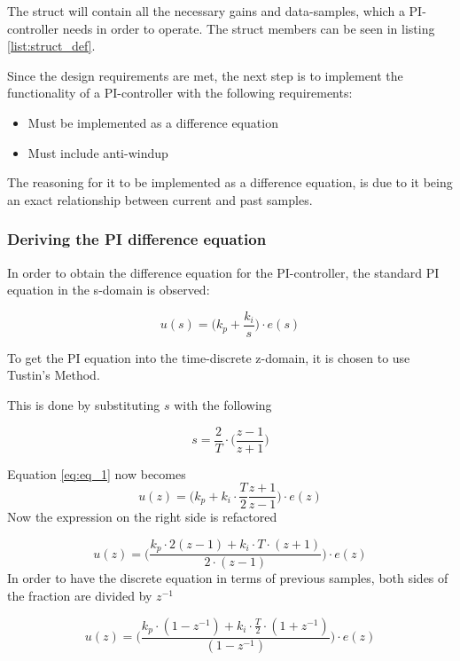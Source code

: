 \documentclass[../../../main]{subfiles}
\begin{document}
The struct will contain all the necessary gains and data-samples, which a PI-controller needs in order to operate.
The struct members can be seen in listing \ref{list:struct_def}.


Since the design requirements are met, the next step is to implement the functionality of a PI-controller with the following requirements:
\begin{itemize}
    \item Must be implemented as a difference equation
    \item Must include anti-windup
\end{itemize}
The reasoning for it to be implemented as a difference equation, is due to it being an exact relationship between current and past samples.

\subsubsection{Deriving the PI difference equation}

In order to obtain the difference equation for the PI-controller, the standard PI equation in the s-domain is observed:

\begin{equation}
  u(s) = \Bigg(k_p + \frac{k_i}{s} \Bigg) \cdot e(s) \label{eq:eq_1}
\end{equation}


To get the PI equation into the time-discrete z-domain, it is chosen to use Tustin's Method.

This is done by substituting $s$ with the following

$$
s = \frac{2}{T}\cdot \Bigg( \frac{z-1}{z+1}\Bigg)
$$

Equation \eqref{eq:eq_1} now becomes
$$
  u(z) = \Bigg(k_p + k_i\cdot \frac{T}{2} \frac{z+1}{z-1} \Bigg) \cdot e(z)
$$
Now the expression on the right side is refactored

$$
  u(z) = \Bigg( \frac{k_p \cdot 2(z-1) + k_i \cdot T \cdot (z+1)}{2\cdot (z-1)}\Bigg) \cdot e(z)
$$
In order to have the discrete equation in terms of previous samples, both sides of the fraction are divided by $z^{-1}$

$$
  u(z) = \Bigg( \frac{k_p \cdot(1-z^{-1}) + k_i \cdot \frac{T}{2} \cdot (1+z^{-1}) }{(1-z^{-1})}\Bigg) \cdot e(z)
$$
\end{document}
